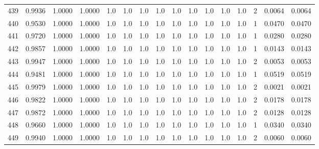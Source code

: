 \begin{tabular}{lrrrrrrrrrrrrrrr}
439 &      0.9936 &  1.0000 &  1.0000 &     1.0 &     1.0 &     1.0 &     1.0 &     1.0 &     1.0 &     1.0 &      1.0 &        1.0 &      2 &                    0.0064 &                     0.0064 \\
440 &      0.9530 &  1.0000 &  1.0000 &     1.0 &     1.0 &     1.0 &     1.0 &     1.0 &     1.0 &     1.0 &      1.0 &        1.0 &      1 &                    0.0470 &                     0.0470 \\
441 &      0.9720 &  1.0000 &  1.0000 &     1.0 &     1.0 &     1.0 &     1.0 &     1.0 &     1.0 &     1.0 &      1.0 &        1.0 &      1 &                    0.0280 &                     0.0280 \\
442 &      0.9857 &  1.0000 &  1.0000 &     1.0 &     1.0 &     1.0 &     1.0 &     1.0 &     1.0 &     1.0 &      1.0 &        1.0 &      1 &                    0.0143 &                     0.0143 \\
443 &      0.9947 &  1.0000 &  1.0000 &     1.0 &     1.0 &     1.0 &     1.0 &     1.0 &     1.0 &     1.0 &      1.0 &        1.0 &      2 &                    0.0053 &                     0.0053 \\
444 &      0.9481 &  1.0000 &  1.0000 &     1.0 &     1.0 &     1.0 &     1.0 &     1.0 &     1.0 &     1.0 &      1.0 &        1.0 &      1 &                    0.0519 &                     0.0519 \\
445 &      0.9979 &  1.0000 &  1.0000 &     1.0 &     1.0 &     1.0 &     1.0 &     1.0 &     1.0 &     1.0 &      1.0 &        1.0 &      2 &                    0.0021 &                     0.0021 \\
446 &      0.9822 &  1.0000 &  1.0000 &     1.0 &     1.0 &     1.0 &     1.0 &     1.0 &     1.0 &     1.0 &      1.0 &        1.0 &      2 &                    0.0178 &                     0.0178 \\
447 &      0.9872 &  1.0000 &  1.0000 &     1.0 &     1.0 &     1.0 &     1.0 &     1.0 &     1.0 &     1.0 &      1.0 &        1.0 &      2 &                    0.0128 &                     0.0128 \\
448 &      0.9660 &  1.0000 &  1.0000 &     1.0 &     1.0 &     1.0 &     1.0 &     1.0 &     1.0 &     1.0 &      1.0 &        1.0 &      1 &                    0.0340 &                     0.0340 \\
449 &      0.9940 &  1.0000 &  1.0000 &     1.0 &     1.0 &     1.0 &     1.0 &     1.0 &     1.0 &     1.0 &      1.0 &        1.0 &      2 &                    0.0060 &                     0.0060 \\

\end{tabular}
